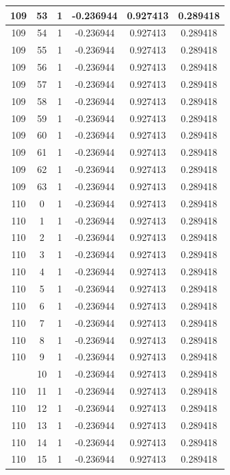 \documentclass[12pt,a4paper]{article}
\numberwithin{equation}{section}
\numberwithin{figure}{section}
\numberwithin{table}{section}
\begin{document}
\begin{longtable}{|c|c|c|c|c|c|}
109 & 53 & 1 & -0.236944 & 0.927413 & 0.289418 \\ \hline
109 & 54 & 1 & -0.236944 & 0.927413 & 0.289418 \\ \hline
109 & 55 & 1 & -0.236944 & 0.927413 & 0.289418 \\ \hline
109 & 56 & 1 & -0.236944 & 0.927413 & 0.289418 \\ \hline
109 & 57 & 1 & -0.236944 & 0.927413 & 0.289418 \\ \hline
109 & 58 & 1 & -0.236944 & 0.927413 & 0.289418 \\ \hline
109 & 59 & 1 & -0.236944 & 0.927413 & 0.289418 \\ \hline
109 & 60 & 1 & -0.236944 & 0.927413 & 0.289418 \\ \hline
109 & 61 & 1 & -0.236944 & 0.927413 & 0.289418 \\ \hline
109 & 62 & 1 & -0.236944 & 0.927413 & 0.289418 \\ \hline
109 & 63 & 1 & -0.236944 & 0.927413 & 0.289418 \\ \hline
110 & 0 & 1 & -0.236944 & 0.927413 & 0.289418 \\ \hline
110 & 1 & 1 & -0.236944 & 0.927413 & 0.289418 \\ \hline
110 & 2 & 1 & -0.236944 & 0.927413 & 0.289418 \\ \hline
110 & 3 & 1 & -0.236944 & 0.927413 & 0.289418 \\ \hline
110 & 4 & 1 & -0.236944 & 0.927413 & 0.289418 \\ \hline
110 & 5 & 1 & -0.236944 & 0.927413 & 0.289418 \\ \hline
110 & 6 & 1 & -0.236944 & 0.927413 & 0.289418 \\ \hline
110 & 7 & 1 & -0.236944 & 0.927413 & 0.289418 \\ \hline
110 & 8 & 1 & -0.236944 & 0.927413 & 0.289418 \\ \hline
110 & 9 & 1 & -0.236944 & 0.927413 & 0.289418 \\ \hline
\pagebreak
110 & 10 & 1 & -0.236944 & 0.927413 & 0.289418 \\ \hline
110 & 11 & 1 & -0.236944 & 0.927413 & 0.289418 \\ \hline
110 & 12 & 1 & -0.236944 & 0.927413 & 0.289418 \\ \hline
110 & 13 & 1 & -0.236944 & 0.927413 & 0.289418 \\ \hline
110 & 14 & 1 & -0.236944 & 0.927413 & 0.289418 \\ \hline
110 & 15 & 1 & -0.236944 & 0.927413 & 0.289418 \\ \hline

\end{longtable}
\end{document}

